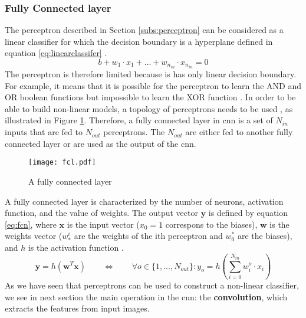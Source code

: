 \subsubsection{Fully Connected layer} \label{subs:fcl}
The perceptron described in Section \ref{subs:perceptron} can be considered as a linear classifier for which the decision boundary is a hyperplane defined in equation \eqref{eq:linearclassifer} \cite{matteucci_artificial_2019}.
%
\begin{equation}
    b + w_1 \cdot x_1 + ... + w_{n_{in}} \cdot x_{n_{in}} = 0
    \label{eq:linearclassifer}
\end{equation}
%
The perceptron is therefore limited because is has only linear decision boundary. For example, it means that it is possible for the perceptron to learn the AND and OR boolean functions but impossible to learn the XOR function \cite{minsky_perceptrons_1969}. In order to be able to build non-linear models, a topology of perceptrons needs to be used \cite{khan_survey_2020}, as illustrated in Figure \ref{fig:fcn}. Therefore, a fully connected layer in \acrshort{cnn} is a set of $N_{in}$ inputs that are fed to $N_{out}$ perceptrons. The $N_{out}$ are either fed to another fully connected layer or are used as the output of the \acrshort{cnn}.
%
\begin{figure}[H]
    \centering
    \texttt{[image: fcl.pdf]}
    \caption{A fully connected layer}
    \label{fig:fcn}
\end{figure}
%
A fully connected layer is characterized by the number of neurons, activation function, and the value of weights. The output vector $\boldsymbol{y}$ is defined by equation \eqref{eq:fcn}, where $\boldsymbol{x}$ is the input vector ($x_0 = 1$ correspons to the biases), $\boldsymbol{w}$ is the weights vector ($w^i_*$ are the weights of the ith perceptron and $w^*_0$ are the biases), and $h$ is the activation function \cite{abdelouahab_accelerating_2018}.
%
\begin{equation}
    \boldsymbol{y} = h(\boldsymbol{w}^T \boldsymbol{x}) \qquad \Leftrightarrow \qquad \forall o \in \{ 1, ..., N_{out} \} : y_o = h(\sum^{N_{in}}_{i=0} w^o_i \cdot x_i)
    \label{eq:fcn}
\end{equation}
%
As we have seen that perceptrons can be used to construct a non-linear classifier, we see in next section the main operation in the \acrshort{cnn}: the \textbf{convolution}, which extracts the features from input images.